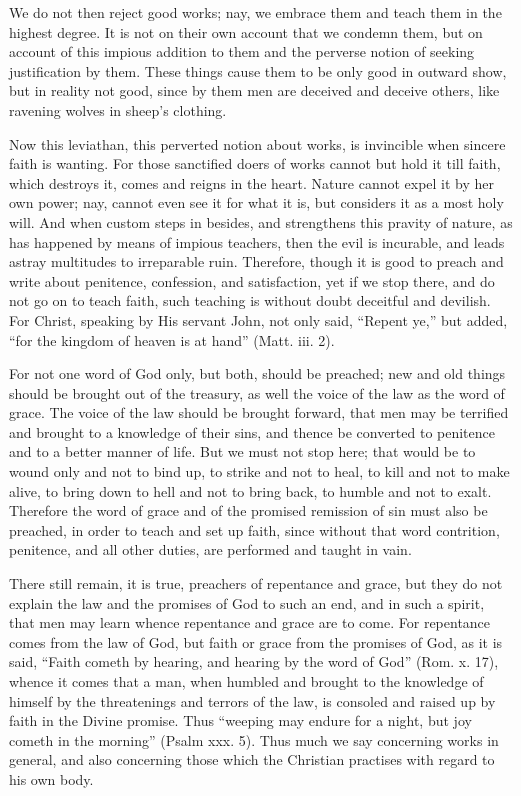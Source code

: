 We do not then reject good works; nay, we embrace them and teach them in
the highest degree. It is not on their own account that we condemn them,
but on account of this impious addition to them and the perverse notion of
seeking justification by them. These things cause them to be only good in
outward show, but in reality not good, since by them men are deceived and
deceive others, like ravening wolves in sheep's clothing.

Now this leviathan, this perverted notion about works, is invincible when
sincere faith is wanting. For those sanctified doers of works cannot but
hold it till faith, which destroys it, comes and reigns in the heart.
Nature cannot expel it by her own power; nay, cannot even see it for what
it is, but considers it as a most holy will. And when custom steps in
besides, and strengthens this pravity of nature, as has happened by means
of impious teachers, then the evil is incurable, and leads astray
multitudes to irreparable ruin. Therefore, though it is good to preach and
write about penitence, confession, and satisfaction, yet if we stop there,
and do not go on to teach faith, such teaching is without doubt deceitful
and devilish. For Christ, speaking by His servant John, not only said,
``Repent ye,'' but added, ``for the kingdom of heaven is at hand'' (Matt. iii.
2).

For not one word of God only, but both, should be preached; new and old
things should be brought out of the treasury, as well the voice of the law
as the word of grace. The voice of the law should be brought forward, that
men may be terrified and brought to a knowledge of their sins, and thence
be converted to penitence and to a better manner of life. But we must not
stop here; that would be to wound only and not to bind up, to strike and
not to heal, to kill and not to make alive, to bring down to hell and not
to bring back, to humble and not to exalt. Therefore the word of grace and
of the promised remission of sin must also be preached, in order to teach
and set up faith, since without that word contrition, penitence, and all
other duties, are performed and taught in vain.

There still remain, it is true, preachers of repentance and grace, but
they do not explain the law and the promises of God to such an end, and in
such a spirit, that men may learn whence repentance and grace are to come.
For repentance comes from the law of God, but faith or grace from the
promises of God, as it is said, ``Faith cometh by hearing, and hearing by
the word of God'' (Rom. x. 17), whence it comes that a man, when humbled
and brought to the knowledge of himself by the threatenings and terrors of
the law, is consoled and raised up by faith in the Divine promise. Thus
``weeping may endure for a night, but joy cometh in the morning'' (Psalm
xxx. 5). Thus much we say concerning works in general, and also concerning
those which the Christian practises with regard to his own body.

